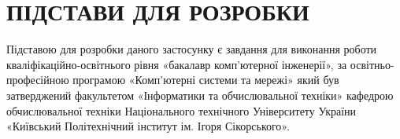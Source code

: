 \begingroup
\renewcommand{\cleardoublepage}{}
\renewcommand{\clearpage}{}
\chapter{ПІДСТАВИ ДЛЯ РОЗРОБКИ}
\endgroup

\vspace{-\baselineskip}

Підставою для розробки даного застосунку є завдання для  виконання роботи кваліфікаційно-освітнього рівня «бакалавр комп'ютерної інженерії», за освітньо-професійною програмою «Комп’ютерні системи та мережі» який був затверджений факультетом «Інформатики та обчислювальної техніки» кафедрою обчислювальної техніки Національного технічного Університету України «Київський Політехнічний інститут ім. Ігоря Сікорського».

\bigskip
\bigskip
\bigskip
\bigskip